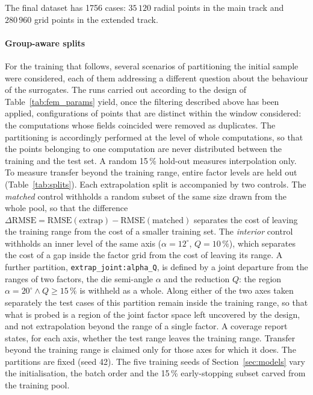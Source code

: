 \documentclass[pdflatex,sn-basic,Numbered]{sn-jnl}
\begin{document}
The final dataset has 1756 cases: $35\,120$ radial points in the main track and $280\,960$ grid points in the extended track.

\paragraph{Group-aware splits}
For the training that follows, several scenarios of partitioning the initial sample were considered, each of them addressing a different question about the behaviour of the surrogates.
The runs carried out according to the design of Table~\ref{tab:fem_params} yield, once the filtering described above has been applied, configurations of points that are distinct within the window considered: the computations whose fields coincided were removed as duplicates. The partitioning is accordingly performed at the level of whole computations, so that the points belonging to one computation are never distributed between the training and the test set.
A random 15\,\% hold-out measures interpolation only. To measure transfer beyond the training range, entire factor levels are held out (Table~\ref{tab:splits}).
Each extrapolation split is accompanied by two controls. The \emph{matched} control withholds a random subset of the same size drawn from the whole pool, so that the difference $\Delta\mathrm{RMSE} = \mathrm{RMSE}(\text{extrap}) - \mathrm{RMSE}(\text{matched})$ separates the cost of leaving the training range from the cost of a smaller training set.
The \emph{interior} control withholds an inner level of the same axis ($\alpha = 12^\circ$, $Q = 10\,\%$), which separates the cost of a gap inside the factor grid from the cost of leaving its range.
A further partition, \texttt{extrap\_joint:alpha\_Q}, is defined by a joint departure from the ranges of two factors, the die semi-angle $\alpha$ and the reduction $Q$: the region $\alpha = 20^\circ \wedge Q \ge 15\,\%$ is withheld as a whole. Along either of the two axes taken separately the test cases of this partition remain inside the training range, so that what is probed is a region of the joint factor space left uncovered by the design, and not extrapolation beyond the range of a single factor.
A coverage report states, for each axis, whether the test range leaves the training range. Transfer beyond the training range is claimed only for those axes for which it does.
The partitions are fixed (seed 42). The five training seeds of Section~\ref{sec:models} vary the initialisation, the batch order and the 15\,\% early-stopping subset carved from the training pool.
\end{document}
